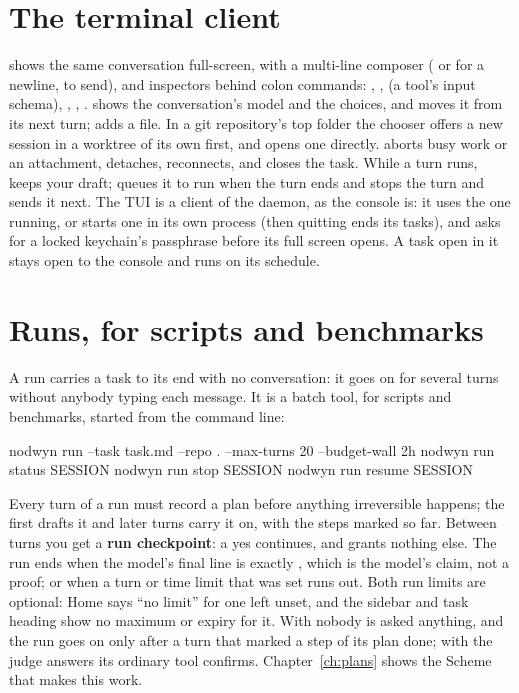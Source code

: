 \section{The terminal client}

 shows the same conversation full-screen, with a multi-line
composer ( or  for a newline,  to
send), and inspectors behind colon commands: , ,
 (a tool's input schema), ,
, .  shows the
conversation's model and the choices, and  moves
it from its next turn;  adds a file. In a git
repository's top folder the chooser offers a new session in a worktree of its
own first, and  opens one directly.  aborts busy
work or an attachment,  detaches,  reconnects, and
 closes the task. While a turn runs,  keeps your draft;
 queues it to run when the turn ends and  stops the
turn and sends it next. The TUI is a client of the daemon, as the
console is: it uses the one running, or starts one in its own process (then
quitting ends its tasks), and asks for a locked keychain's passphrase before
its full screen opens. A task open in it stays open to the console and runs
on its schedule.

\section{Runs, for scripts and benchmarks}

A run carries a task to its end with no conversation: it goes on for
several turns without anybody typing each message. It is a batch tool, for
scripts and benchmarks, started from the command line:

\begin{sh}
nodwyn run --task task.md --repo . --max-turns 20 --budget-wall 2h
nodwyn run status SESSION
nodwyn run stop SESSION
nodwyn run resume SESSION
\end{sh}

Every turn of a run must record a plan before anything irreversible
happens; the first drafts it and later turns carry it on, with the steps
marked so far. Between turns you get a \textbf{run checkpoint}: a yes
continues, and grants nothing else. The run ends when the model's final line
is exactly , which is the model's claim, not a
proof; or when a turn or time limit that was set runs out. Both run limits
are optional: Home says ``no limit'' for one left unset, and the sidebar and
task heading show no maximum or expiry for it. With
 nobody is asked anything, and the run goes on only
after a turn that marked a step of its plan done; with  the
judge answers its ordinary tool confirms. Chapter~\ref{ch:plans} shows the
Scheme that makes this work.

